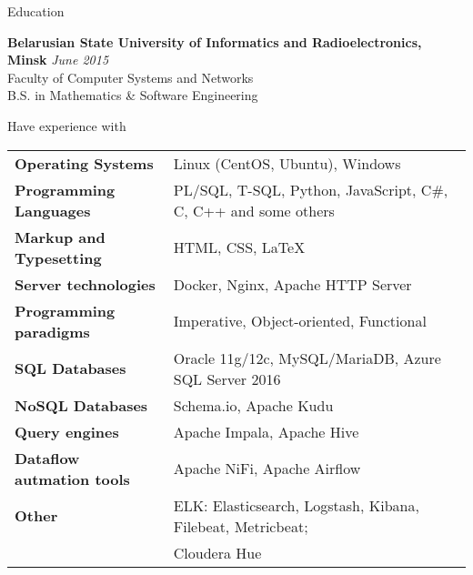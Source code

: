 \documentclass{resume} %
\begin{document}

\begin{rSection}{Education}

{\bf Belarusian State University of Informatics and Radioelectronics, Minsk} \hfill {\em June 2015} \\ 
Faculty of Computer Systems and Networks \\
B.S. in Mathematics \& Software Engineering \\

\end{rSection}


\begin{rSection}{Have experience with}

\begin{tabular}{ @{} >{\bfseries}l @{\hspace{6ex}} l }
Operating Systems      & Linux (CentOS, Ubuntu), Windows \smallskip \\
Programming Languages  & PL/SQL, T-SQL, Python, JavaScript, C\#, C, C++ and some others \smallskip \\
Markup and Typesetting & HTML, CSS, \LaTeX \smallskip \\
Server technologies    & Docker, Nginx, Apache HTTP Server \smallskip \\
Programming paradigms & Imperative, Object-oriented, Functional \smallskip \\
SQL Databases          & Oracle 11g/12c, MySQL/MariaDB, Azure SQL Server 2016 \smallskip \\
NoSQL Databases        & Schema.io, Apache Kudu  \smallskip \\
Query engines & Apache Impala, Apache Hive \smallskip \\
Dataflow autmation tools & Apache NiFi, Apache Airflow \smallskip \\
Other                  & ELK: Elasticsearch, Logstash, Kibana, Filebeat, Metricbeat; \\
& Cloudera Hue \\
\end{tabular}

\end{rSection}
\end{document}
